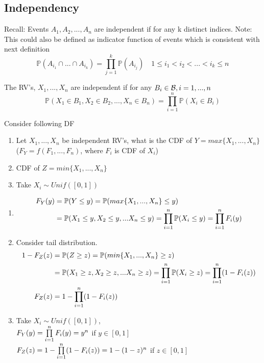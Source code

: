 \subsection{Independency}
Recall: Events $A_1, A_2,...,A_n$ are independent if for any k distinct indices. Note: This could also be defined as indicator function of events which is consistent with next definition
\begin{equation*}
    \mathbb{P}(A_{i_1} \cap... \cap A_{i_k}) = \prod\limits_{j = 1}^{k} \mathbb{P}(A_{i_j})\quad 1\leq i_1 < i_2 < ... < i_k \leq n
\end{equation*}
\begin{dfn}
The RV's, $X_1, ...,X_n$ are independent if for any $B_i \in \mathcal{B}, i=1,...,n$
\begin{equation*}
    \mathbb{P}(X_1\in B_1,X_2\in B_2, ...,X_n\in B_n) = \prod\limits_{i = 1}^{n} \mathbb{P}(X_i\in B_i)
\end{equation*}
\end{dfn}
\begin{ex}
Consider following DF
\begin{enumerate}
    \item Let $X_1, ...,X_n$ be independent RV's, what is the CDF of $Y = max\{X_1, ...,X_n\}$\\
    ($F_Y = f(F_1, ..., F_n)$, where $F_i$ is CDF of $X_i$)
    \item CDF of $Z = min\{X_1, ...,X_n\}$
    \item Take $X_i \sim Unif([0,1])$
\end{enumerate}
\end{ex}
\begin{enumerate}
    \item \begin{align*}
        F_Y(y) &= \mathbb{P}(Y\leq y) = \mathbb{P}(max\{X_1, ...,X_n\} \leq y) \\
        &= \mathbb{P}(X_1 \leq y, X_2 \leq y, ...X_n \leq y) = \prod\limits_{i=1}^n \mathbb{P}(X_i \leq y) = \prod\limits_{i=1}^n F_i(y)
    \end{align*}
    \item Consider tail distribution.
    \begin{align*}
        1-F_Z(z) &= \mathbb{P}(Z\geq z) = \mathbb{P}(min\{X_1, ...,X_n\} \geq z) \\
        &= \mathbb{P}(X_1 \geq z, X_2 \geq z, ...X_n \geq z) = \prod\limits_{i=1}^n \mathbb{P}(X_i \geq z) = \prod\limits_{i=1}^n (1-F_i(z)) \\
        F_Z(z) &= 1-\prod\limits_{i=1}^n (1-F_i(z))
    \end{align*}
    \item Take $X_i \sim Unif([0,1])$, \\
    $F_Y(y)= \prod\limits_{i=1}^n F_i(y) = y^n$ if $y \in [0,1]$ \\
    $F_Z(z)= 1-\prod\limits_{i=1}^n (1-F_i(z)) = 1-(1-z)^n$ if $z \in [0,1]$

\end{enumerate}
